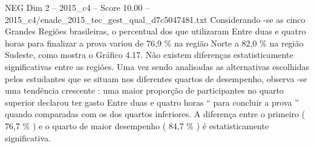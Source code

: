 \begin{textsample}{NEG Dim 2 – 2015\_c4 – Score 10.00 – 2015\_c4/enade\_2015\_tec\_gest\_qual\_d7c5047481.txt}
Considerando -se as cinco Grandes Regiões brasileiras, o percentual dos que utilizaram Entre duas e quatro horas para finalizar a prova variou de 76,9 \% na região Norte a 82,0 \% na região Sudeste, como mostra o Gráfico 4.17.
Não existem diferenças estatisticamente significativas entre as regiões.
Uma vez sendo analisadas as alternativas escolhidas pelos estudantes que se situam nos diferentes quartos de desempenho, observa -se uma tendência crescente : uma maior proporção de participantes no quarto superior declarou ter gasto Entre duas e quatro horas “ para concluir a prova ” quando comparadas com os dos quartos inferiores.
A diferença entre o primeiro ( 76,7 \% ) e o quarto de maior desempenho ( 84,7 \% ) é estatisticamente significativa.

\end{textsample}

